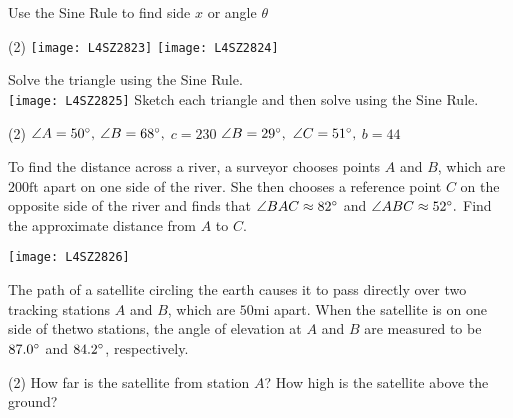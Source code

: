 \begin{Exercise}[title={Applications},label=exApplications]
	\Question Use the Sine Rule to find side $x$ or angle $\theta $ 
	\begin{tasks}(2)
		\task 	\texttt{[image: L4SZ2823]}%
		\task 	\texttt{[image: L4SZ2824]}%
	\end{tasks}
	\Question Solve the triangle using the Sine Rule.  \\
	\texttt{[image: L4SZ2825]}%
		\Question Sketch each triangle and then solve using the Sine Rule. 
	\begin{tasks}(2)
		\task 	$\angle A =50 \mbox{{\ensuremath{{}^\circ}}}\text{,}$ $\angle B =68 \mbox{{\ensuremath{{}^\circ}}}\text{,}$ $c =230$%
		\task 	$\angle B =29 \mbox{{\ensuremath{{}^\circ}}}\text{,}$ $\angle C =51 \mbox{{\ensuremath{{}^\circ}}}\text{,}$ $b =44$%
	\end{tasks}
\begin{multicols}{2}
	\Question To find the distance across a river, a surveyor chooses points $A$ and $B$, which are $200 \mbox{ft}$ apart on one side of the river. She then chooses a reference point $C$ on the opposite side of the river and finds that $\angle BAC \approx 82 \mbox{{\ensuremath{{}^\circ}}}$ and $\angle ABC \approx 52 \mbox{{\ensuremath{{}^\circ}}}\text{.}$  Find the approximate distance from $A$ to $C$. \\%
	\columnbreak 
	
\texttt{[image: L4SZ2826]}	\\
\end{multicols}

	\Question The path of a satellite circling the earth causes it to pass directly over two tracking stations $A$ and $B$, which are $50 \mbox{mi}$ apart. When the satellite is on one side of thetwo stations, the angle of elevation at $A$ and $B$ are measured to be $87.0 \mbox{{\ensuremath{{}^\circ}}}$ and $84.2 \mbox{{\ensuremath{{}^\circ}}}$, respectively.  
\begin{tasks}(2)
	\task How far is the satellite from	station $A$?%
	\task How high is the satellite	above the ground?%
\end{tasks}
	

\end{Exercise}
